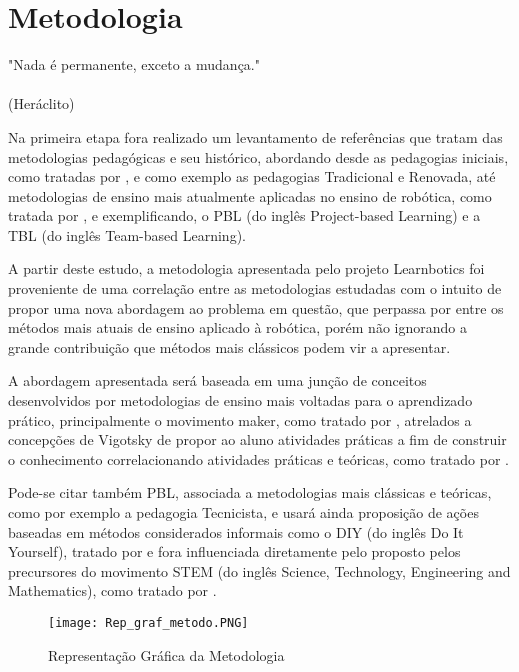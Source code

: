 \chapter{Metodologia}
\label{chap:meto}
\begin{flushright}
	"Nada é permanente, exceto a mudança." \\
	\ \\
	(Heráclito)
\end{flushright}

Na primeira etapa fora realizado um levantamento de referências que tratam das metodologias pedagógicas e seu histórico, abordando desde as pedagogias iniciais, como tratadas por \cite{larchert}, e como exemplo as pedagogias Tradicional e Renovada, até metodologias de ensino mais atualmente aplicadas no ensino de robótica, como tratada por \cite{Dillen}, e exemplificando, o PBL (do inglês Project-based Learning) e a TBL (do inglês Team-based Learning).

A partir deste estudo, a metodologia apresentada pelo projeto Learnbotics foi proveniente de uma correlação entre as metodologias estudadas com o intuito de propor uma nova abordagem ao problema em questão, que perpassa por entre os métodos mais atuais de ensino aplicado à robótica, porém não ignorando a grande
contribuição que métodos mais clássicos podem vir a apresentar.

A abordagem apresentada será baseada em uma junção de conceitos desenvolvidos por metodologias de ensino mais voltadas para o aprendizado prático, principalmente o movimento maker, como tratado por \cite{Dillen}, atrelados a concepções de Vigotsky de propor ao aluno atividades práticas a fim de construir o conhecimento correlacionando atividades práticas e teóricas, como tratado por \cite{Palangana}.

Pode-se citar também PBL, associada a metodologias mais clássicas e teóricas, como por exemplo a pedagogia Tecnicista, e usará ainda proposição de ações baseadas em métodos considerados informais como o DIY (do inglês Do It Yourself), tratado por \cite{wolf} e fora influenciada diretamente pelo proposto pelos precursores do movimento STEM (do inglês Science, Technology, Engineering and Mathematics), como tratado por \cite{pugli}.

\begin{figure}[h!]												
	\centering		
	\texttt{[image: Rep\_graf\_metodo.PNG]}			
	\caption{Representação Gráfica da Metodologia}		
	\label{img:rep_metod}	
\end{figure}

